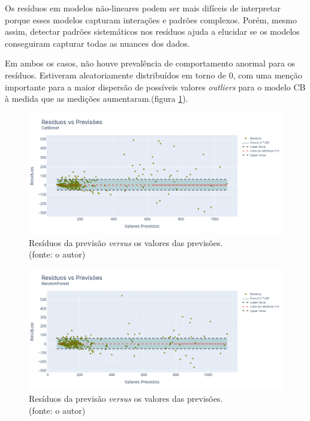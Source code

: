 Os resíduos em modelos não-lineares podem ser mais difíceis de interpretar porque esses modelos capturam interações e padrões complexos. Porém, mesmo assim, detectar padrões sistemáticos nos resíduos ajuda a elucidar se os modelos conseguiram capturar todas as nuances dos dados.

Em ambos os casos, não houve prevalência de comportamento anormal para os resíduos. Estiveram aleatoriamente distribuídos em torno de $0$, com uma menção importante para a maior dispersão de possíveis valores \textit{outliers} para o modelo CB à medida que as medições aumentaram.(figura \ref{fig:jequiti_CB_WFV_LOG_RESID_x_PREV}).

\begin{figure}[!h]
\centering
\includegraphics[scale=0.33]{Figuras/jequiti/resultados/CB_WFV_LOG_RESID_x_PREV.png}
\caption{Resíduos da previsão \textit{versus} os valores das previsões.\\(fonte: o autor)}
\label{fig:jequiti_CB_WFV_LOG_RESID_x_PREV}
\end{figure}

\begin{figure}[!h]
\centering
\includegraphics[scale=0.33]{Figuras/jequiti/resultados/RF_WFV_LOG_RESID_x_PREV.png}
\caption{Resíduos da previsão \textit{versus} os valores das previsões.\\(fonte: o autor)}
\label{fig:jequiti_RF_WFV_LOG_RESID_x_PREV}
\end{figure}
\clearpage

